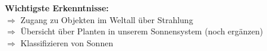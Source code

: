 \begin{itemize}
\end{itemize}

\textbf{Wichtigste Erkenntnisse:}\\
$\Longrightarrow$ Zugang zu Objekten im Weltall über Strahlung\\
$\Longrightarrow$ Übersicht über Planten in unserem Sonnensystem (noch ergänzen)\\
$\Longrightarrow$ Klassifizieren von Sonnen
